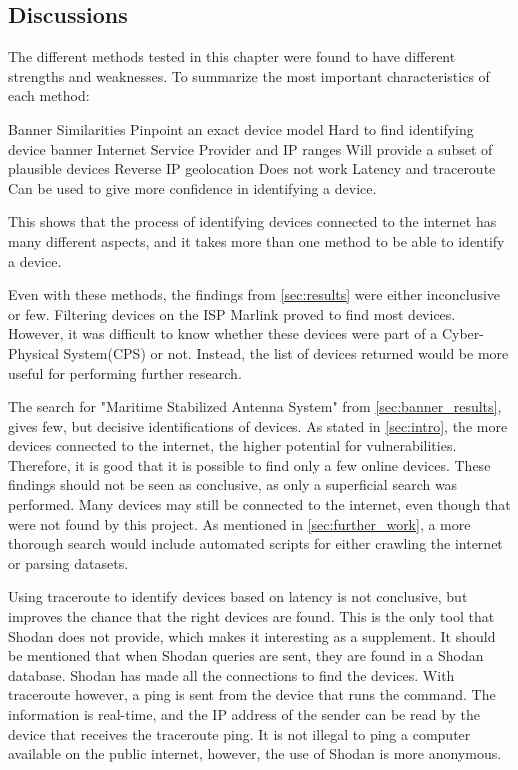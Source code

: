 \subsection{Discussions}

The different methods tested in this chapter were found to have different strengths and weaknesses. To summarize the most important characteristics of each method:

\begin{outline}[itemize]
    \setlength\itemsep{10em}
        \1 Banner Similarities
        \2 Pinpoint an exact device model
        \2 Hard to find identifying device banner
        \1 Internet Service Provider and IP ranges
        \2 Will provide a subset of plausible devices
        \1 Reverse IP geolocation
        \2 Does not work
        \1 Latency and traceroute
        \2 Can be used to give more confidence in identifying a device.

\end{outline}

This shows that the process of identifying devices connected to the internet has many different aspects, and it takes more than one method to be able to identify a device.

Even with these methods, the findings from \cref{sec:results} were either inconclusive or few. Filtering devices on the ISP Marlink proved to find most devices. However, it was difficult to know whether these devices were part of a Cyber-Physical System(CPS) or not. Instead, the list of devices returned would be more useful for performing further research. 

The search for "Maritime Stabilized Antenna System" from \cref{sec:banner_results}, gives few, but decisive identifications of devices. As stated in \cref{sec:intro}, the more devices connected to the internet, the higher potential for vulnerabilities. Therefore, it is good that it is possible to find only a few online devices. These findings should not be seen as conclusive, as only a superficial search was performed. Many devices may still be connected to the internet, even though that were not found by this project. As mentioned in \cref{sec:further_work}, a more thorough search would include automated scripts for either crawling the internet or parsing datasets. 

Using traceroute to identify devices based on latency is not conclusive, but improves the chance that the right devices are found. This is the only tool that Shodan does not provide, which makes it interesting as a supplement. It should be mentioned that when Shodan queries are sent, they are found in a Shodan database. Shodan has made all the connections to find the devices. With traceroute however, a ping is sent from the device that runs the command. The information is real-time, and the IP address of the sender can be read by the device that receives the traceroute ping. It is not illegal to ping a computer available on the public internet, however, the use of Shodan is more anonymous. 

